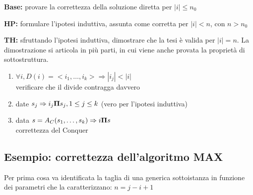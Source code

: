 \begin{description}
    \item{\textbf{Base:}} provare la correttezza della soluzione diretta per $|i| \leq n_0$
    \item{\textbf{HP:}} formulare l'ipotesi induttiva, assunta come corretta per  $|i| < n$, con $n > n_0$
    \item{\textbf{TH:}} sfruttando l'ipotesi induttiva, dimostrare che la tesi è valida per $|i| = n$.
        La dimostrazione si articola in più parti, in cui viene anche provata la proprietà di sottostruttura.
        \begin{enumerate}[noitemsep,topsep=0pt,parsep=0pt,partopsep=0pt]
            \item $\forall i, D(i) = <i_1, \dots, i_k> \Rightarrow |i_j| < |i|$ \\
                verificare che il divide contragga davvero
            \item date $s_j \Rightarrow i_j \bm{\Pi}{} s_j, 1 \leq j \leq k$ (vero per l'ipotesi induttiva)
            \item data $s = A_C (s_1, \dots, s_k) \Rightarrow i \bm{\Pi}{} s$ \\
                correttezza del Conquer
        \end{enumerate}
\end{description}

\subsection{Esempio: correttezza dell'algoritmo MAX}

Per prima cosa va identificata la taglia di una generica sottoistanza in funzione dei parametri che la caratterizzano: $n=j-i+1$


